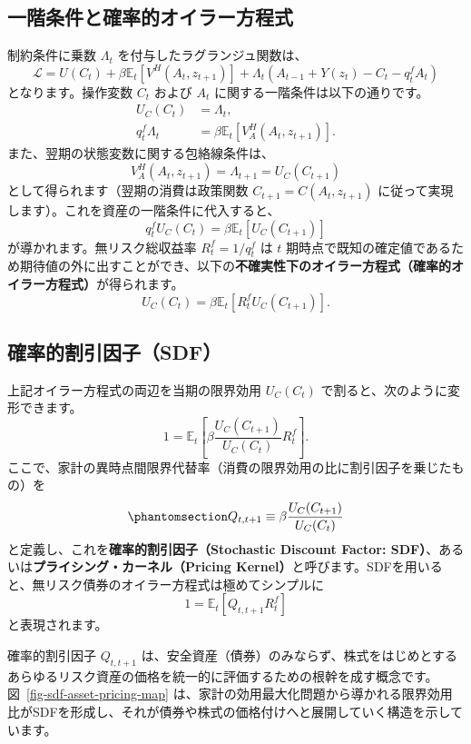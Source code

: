 \documentclass[
  japanese,
  lualatex,
  ja=standard,
  12pt,
  a4paper]{ltjsarticle}
\begin{document}
\subsection{一階条件と確率的オイラー方程式}\label{ux4e00ux968eux6761ux4ef6ux3068ux78baux7387ux7684ux30aaux30a4ux30e9ux30fcux65b9ux7a0bux5f0f}

制約条件に乗数 \(\Lambda_t\) を付与したラグランジュ関数は、 \[
\mathcal{L} = U(C_t) + \beta \mathbb{E}_t \left[ V^H(A_t, z_{t+1}) \right] + \Lambda_t \left( A_{t-1} + Y(z_t) - C_t - q_t^f A_t \right)
\] となります。操作変数 \(C_t\) および \(A_t\)
に関する一階条件は以下の通りです。 \[
\begin{aligned}
U_C(C_t) &= \Lambda_t,\\
q_t^f \Lambda_t &= \beta \mathbb{E}_t \left[ V^H_A(A_t, z_{t+1}) \right].
\end{aligned}
\] また、翌期の状態変数に関する包絡線条件は、 \[
V^H_A(A_t, z_{t+1}) = \Lambda_{t+1} = U_C(C_{t+1})
\] として得られます（翌期の消費は政策関数 \(C_{t+1} = C(A_t, z_{t+1})\)
に従って実現します）。これを資産の一階条件に代入すると、 \[
q_t^f U_C(C_t) = \beta \mathbb{E}_t \left[ U_C(C_{t+1}) \right]
\] が導かれます。無リスク総収益率 \(R_t^f = 1/q_t^f\) は \(t\)
期時点で既知の確定値であるため期待値の外に出すことができ、以下の\textbf{不確実性下のオイラー方程式（確率的オイラー方程式）}が得られます。
\[
U_C(C_t) = \beta \mathbb{E}_t \left[ R_t^f U_C(C_{t+1}) \right].
\]

\subsection{確率的割引因子（SDF）}\label{ux78baux7387ux7684ux5272ux5f15ux56e0ux5b50sdf}

上記オイラー方程式の両辺を当期の限界効用 \(U_C(C_t)\)
で割ると、次のように変形できます。 \[
1 = \mathbb{E}_t \left[ \beta \frac{U_C(C_{t+1})}{U_C(C_t)} R_t^f \right].
\]
ここで、家計の異時点間限界代替率（消費の限界効用の比に割引因子を乗じたもの）を
\begin{equation}\protect\phantomsection\label{eq-sdf}{
Q_{t,t+1} \equiv \beta \frac{U_C(C_{t+1})}{U_C(C_t)}
}\end{equation} と定義し、これを\textbf{確率的割引因子（Stochastic
Discount Factor: SDF）}、あるいは\textbf{プライシング・カーネル（Pricing
Kernel）}と呼びます。SDFを用いると、無リスク債券のオイラー方程式は極めてシンプルに
\[
1 = \mathbb{E}_t \left[ Q_{t,t+1} R_t^f \right]
\] と表現されます。

確率的割引因子 \(Q_{t,t+1}\)
は、安全資産（債券）のみならず、株式をはじめとするあらゆるリスク資産の価格を統一的に評価するための根幹を成す概念です。図~\ref{fig-sdf-asset-pricing-map}
は、家計の効用最大化問題から導かれる限界効用比がSDFを形成し、それが債券や株式の価格付けへと展開していく構造を示しています。
\end{document}
